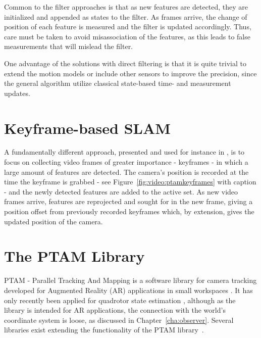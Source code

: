         Common to the filter approaches is that as new features are detected,
        they are initialized and appended as states to the filter.
        As frames arrive, the change of position of each feature is measured and
        the filter is updated accordingly.
        Thus, care must be taken to avoid misassociation of the features, as
        this leads to false measurements that will mislead the filter.

        One advantage of the solutions with direct filtering is that it is quite
        trivial to extend the motion models or include other sensors to improve the precision, since
        the general algorithm utilize classical state-based time- and measurement updates.

    \section{Keyframe-based SLAM}
    \label{sec:video:kfslam}
        A fundamentally different approach, presented and used for instance in \citep{klein07parallel},
        is to focus on collecting video frames of greater importance - keyframes -
        in which a large amount of features are detected.
        The camera's position is recorded at the time the keyframe is grabbed - see Figure~\ref{fig:video:ptamkeyframes} with caption -
        and the newly detected features are added to the active set.
        As new video frames arrive, features are reprojected and sought for in
        the new frame, giving a position offset from previously recorded keyframes which, by
        extension, gives the updated position of the camera.


\pagebreak
    \section{The PTAM Library}
        PTAM - Parallel Tracking And Mapping is a software library for camera tracking
        developed for Augmented Reality (AR) applications in small workspaces \citep{klein07parallel}.
        It has only recently been applied for quadrotor state estimation \citep{weiss11monocular},
        although as the library is intended for AR applications, the connection
        with the world's coordinate system is loose, as discussed in Chapter~\ref{cha:observer}.
        Several libraries exist extending the functionality of the PTAM library~\citep{Nguyen_Sandor_Park_2010}.


